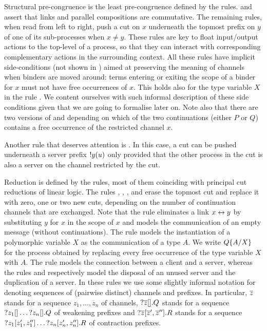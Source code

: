 Structural pre-congruence is the least pre-congruence defined by the
 rules.
%
\SLink and \SComm assert that links and parallel compositions are commutative.
The remaining rules, when read from left to right, push a cut on $x$ underneath
the topmost prefix on $y$ of one of its sub-processes when $x \ne y$. These
rules are key to float input/output actions to the top-level of a process, so
that they can interact with corresponding complementary actions in the
surrounding context.
%
All these rules have implicit side-conditions (not shown in
) aimed at preserving the meaning of channels when binders
are moved around: terms entering or exiting the scope of a binder for $x$ must
not have free occurrences of $x$. This holds also for the type variable $X$ in
the rule \SForall.
%
We content ourselves with such informal description of these side conditions
given that we are going to formalise \Calculus later on.
%
Note also that there are two versions of \SForkL and \SForkR depending on which
of the two continuations (either $P$ or $Q$) contains a free occurrence of the
restricted channel $x$.

%
Another rule that deserves attention is \SServer. In this case, a cut can be
pushed underneath a server prefix ${!}y(u)$ only provided that the other
process in the cut is also a server on the channel restricted by the cut.

Reduction is defined by the  rules, most of them coinciding with
principal cut reductions of linear logic.
%
The rules \RLink, \RClose, \RSelect, \RFork and \RExists erase the topmost cut
and replace it with zero, one or two new cuts, depending on the number of
continuation channels that are exchanged.
%
Note that the rule \RLink eliminates a link $x\leftrightarrow y$ by substituting $y$ for
$x$ in the scope of $x$ and \RClose models the communication of an empty message
(without continuations). The rule \RExists models the instantiation of a
polymorphic variable $X$ as the communication of a type $A$. We write
$Q\{A/X\}$ for the process obtained by replacing every free occurrence of
the type variable $X$ with $A$.
%
The rule \RConnect models the connection between a client and a server, whereas
the rules \RWeaken and \RContract respectively model the disposal of an unused
server and the duplication of a server. In these rules we use some slightly
informal notation for denoting sequences of (pairwise distinct) channels and
prefixes. In particular, $\overline{z}$ stands for a sequence $z_1, \dots, z_n$ of
channels, ${?}\overline{z}[].Q$ stands for a sequence
${?}z_1[]\dots{?}z_n[].Q$ of weakening prefixes and
${?}\overline{z}[\overline{z}',\overline{z}''].R$ stands for a sequence
${?}z_1[z_1',z_1'']\dots{?}z_n[z_n',z_n''].R$ of contraction
prefixes.

